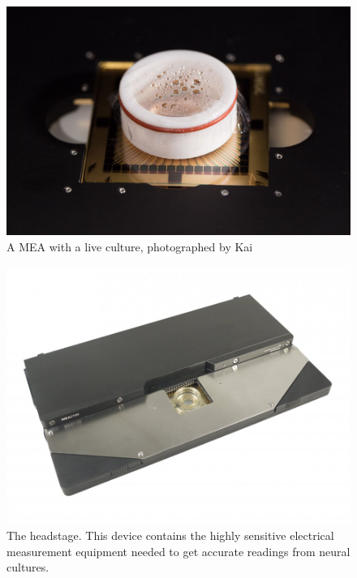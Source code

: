 \begin{figure}[h!]
    \includegraphics[width=\linewidth]{images/st-olavs-mea.jpg}
    \caption{A MEA with a live culture, photographed by Kai}
    \label{fig:st_olav_MEA}
\end{figure}
\begin{figure}[h!]
    \includegraphics[width=\linewidth]{images/MEA2100-HS60.jpg}
    \caption{The headstage.
      This device contains the highly sensitive electrical
      measurement equipment needed to get accurate readings from neural
      cultures.
    }
    \label{fig:headstage}
\end{figure}
